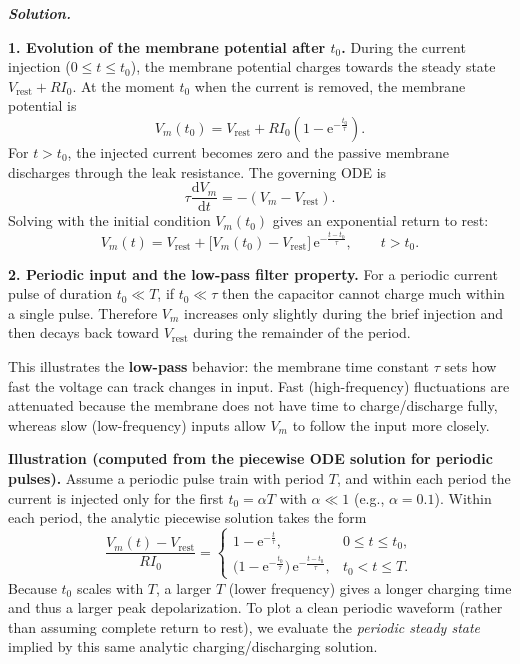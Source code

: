 \documentclass{article}
\newif\ifsolutionclearpage
\newenvironment{solution}{%
    \ifsolutionclearpage\clearpage\fi
    \global\solutionclearpagetrue
    \par\noindent\begin{solutionbox}\textbf{\textit{Solution.}}\par\medskip\itshape
}{%
    \end{solutionbox}
}
\begin{document}
\begin{solution}
\textbf{1. Evolution of the membrane potential after $t_0$.}
During the current injection ($0\le t\le t_0$), the membrane potential charges towards the steady state $V_{\text{rest}}+RI_0$.
At the moment $t_0$ when the current is removed, the membrane potential is
\[
V_m(t_0)=V_{\text{rest}}+RI_0\left(1-\mathrm{e}^{-\frac{t_0}{\tau}}\right).
\]
For $t>t_0$, the injected current becomes zero and the passive membrane discharges through the leak resistance. The governing ODE is
\[
\tau\frac{\mathrm{d}V_m}{\mathrm{d}t}=-(V_m-V_{\text{rest}}).
\]
Solving with the initial condition $V_m(t_0)$ gives an exponential return to rest:
\[
V_m(t)=V_{\text{rest}}+\bigl[V_m(t_0)-V_{\text{rest}}\bigr]\,\mathrm{e}^{-\frac{t-t_0}{\tau}},\qquad t>t_0.
\]

\textbf{2. Periodic input and the low-pass filter property.}
For a periodic current pulse of duration $t_0\ll T$, if $t_0\ll\tau$ then the capacitor cannot charge much within a single pulse.
Therefore $V_m$ increases only slightly during the brief injection and then decays back toward $V_{\text{rest}}$ during the remainder of the period.

This illustrates the \textbf{low-pass} behavior: the membrane time constant $\tau$ sets how fast the voltage can track changes in input.
Fast (high-frequency) fluctuations are attenuated because the membrane does not have time to charge/discharge fully, whereas slow (low-frequency) inputs allow $V_m$ to follow the input more closely.

\medskip
\textbf{Illustration (computed from the piecewise ODE solution for periodic pulses).}
Assume a periodic pulse train with period $T$, and within each period the current is injected only for the first
$t_0=\alpha T$ with $\alpha\ll 1$ (e.g., $\alpha=0.1$). Within each period, the analytic piecewise solution takes the form
\[
\frac{V_m(t)-V_{\text{rest}}}{RI_0}=
\begin{cases}
1-\mathrm{e}^{-\frac{t}{\tau}}, & 0\le t\le t_0,\\
\bigl(1-\mathrm{e}^{-\frac{t_0}{\tau}}\bigr)\,\mathrm{e}^{-\frac{t-t_0}{\tau}}, & t_0<t\le T.
\end{cases}
\]
Because $t_0$ scales with $T$, a larger $T$ (lower frequency) gives a longer charging time and thus a larger peak depolarization.
To plot a clean periodic waveform (rather than assuming complete return to rest), we evaluate the \emph{periodic steady state} implied by this same analytic charging/discharging solution.


\end{solution}
\end{document}
